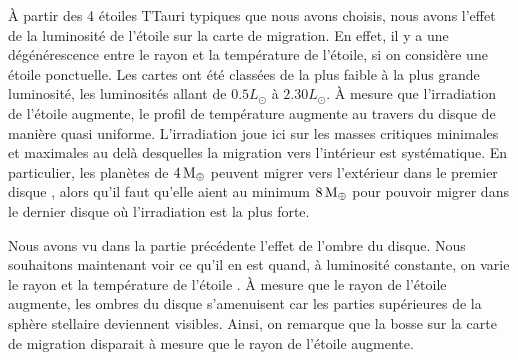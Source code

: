 À partir des 4 étoiles TTauri typiques que nous avons choisis, nous avons l'effet de la luminosité de l'étoile sur la carte de migration. En effet, il y a une dégénérescence entre le rayon et la température de l'étoile, si on considère une étoile ponctuelle. Les cartes ont été classées de la plus faible à la plus grande luminosité, les luminosités allant de $0.5\unit{L_\odot}$ à $2.30\unit{L_\odot}$. À mesure que l'irradiation de l'étoile augmente, le profil de température augmente au travers du disque de manière quasi uniforme. L'irradiation joue ici sur les masses critiques minimales et maximales au delà desquelles la migration vers l'intérieur est systématique. En particulier, les planètes de $4\mathrm{\thinspace M_\oplus}$ peuvent migrer vers l'extérieur dans le premier disque , alors qu'il faut qu'elle aient au minimum $8\mathrm{\thinspace M_\oplus}$ pour pouvoir migrer dans le dernier disque  où l'irradiation est la plus forte. 

\bigskip

Nous avons vu dans la partie précédente l'effet de l'ombre du disque. Nous souhaitons maintenant voir ce qu'il en est quand, à
luminosité constante, on varie le rayon et la température de l'étoile . À mesure que le rayon de
l'étoile augmente, les ombres du disque s'amenuisent car les parties supérieures de la sphère stellaire deviennent visibles.
Ainsi, on remarque que la bosse sur la carte de migration disparait à mesure que le rayon de l'étoile augmente. 

